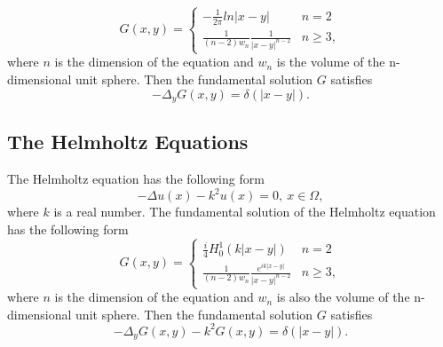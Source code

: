 \documentclass[hyperref]{article}
\numberwithin{equation}{section}
\theoremstyle{nonumberplain}
\begin{document}
	$$
	G(x,y)=\left\{\begin{array}{cc}
		-\frac{1}{2\pi}ln|x-y|  & n=2 \\[0.5em]
		\frac{1}{(n-2)w_n}\frac{1}{|x-y|^{n-2}} & n\geq 3, 
	\end{array}
	\right.
	$$
	where $n$ is the dimension of the equation and $w_n$ is the volume of the n-dimensional unit sphere. Then the fundamental solution $G$ satisfies
	$$
	-\Delta_yG(x,y) = \delta(|x-y|).
	$$
	
	
	\subsection{The Helmholtz Equations}
	The Helmholtz equation has the following form
	\begin{equation}
		-\Delta u(x)-k^2u(x)=0, \ x\in\Omega,
	\end{equation}
	where $k$ is a real number. The fundamental solution of the Helmholtz equation has the following form 
	$$
	G(x,y)=\left\{\begin{array}{cc}
		\frac{i}{4}H_0^1(k|x-y|)  & n=2 \\[0.2em]
		\frac{1}{(n-2)w_n}\frac{e^{ik|x-y|}}{|x-y|^{n-2}} & n\geq 3, 
	\end{array}
	\right.
	$$
	where $n$ is the dimension of the equation and $w_n$ is also the volume of the n-dimensional unit sphere. Then the fundamental solution $G$ satisfies
	$$
	-\Delta_yG(x,y)-k^2G(x,y) = \delta(|x-y|).
	$$
	
	
	
	
\end{document}

